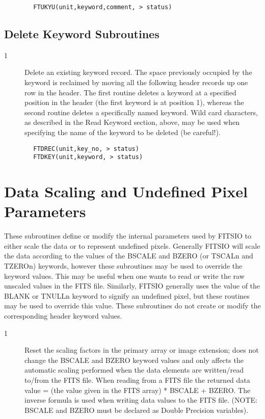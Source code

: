 \documentclass[11pt]{book}
\begin{document}
\begin{verbatim}
        FTUKYU(unit,keyword,comment, > status)
\end{verbatim}

\subsection{Delete Keyword Subroutines \label{FTDREC}}


\begin{description}
\item[1 ] Delete an existing keyword record.  The space previously occupied by
    the keyword is reclaimed by moving all the following header records up
    one row in the header.  The first routine deletes a keyword at a
    specified position in the header (the first keyword is at position 1),
    whereas the second routine deletes a specifically named keyword.
    Wild card characters, as described in the Read Keyword section, above,
    may be used when specifying the name of the keyword to be deleted
   (be careful!).
\end{description}

\begin{verbatim}
        FTDREC(unit,key_no, > status)
        FTDKEY(unit,keyword, > status)
\end{verbatim}


\section{Data Scaling and Undefined Pixel Parameters  \label{FTPSCL}}

These subroutines define or modify the internal parameters used by
FITSIO to either scale the data or to represent undefined pixels.
Generally FITSIO will scale the data according to the values of the BSCALE
and BZERO (or TSCALn and TZEROn) keywords, however these subroutines
may be used to override the keyword values.  This may be useful when
one wants to read or write the raw unscaled values in the FITS file.
Similarly, FITSIO generally uses the value of the BLANK or TNULLn
keyword to signify an undefined pixel, but these routines may be used
to override this value.  These subroutines do not create or modify the
corresponding header keyword values.


\begin{description}
\item[1 ] Reset the scaling factors in the primary array or image extension; does
    not change the BSCALE and BZERO keyword values and only affects the
    automatic scaling performed when the data elements are written/read
    to/from the FITS file.   When reading from a FITS file the returned
    data value = (the value given in the FITS array) * BSCALE + BZERO.
    The inverse formula is used when writing data values to the FITS
    file.  (NOTE: BSCALE and BZERO must be declared as Double Precision
   variables).
\end{description}
\end{document}
